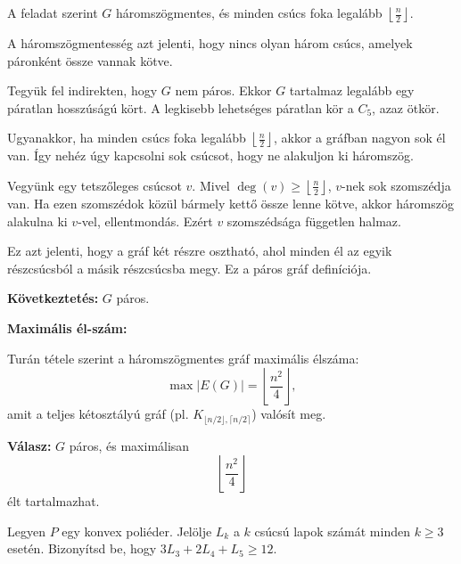 \begin{solution}
	A feladat szerint $G$ háromszögmentes, és minden csúcs foka legalább
	$\left\lfloor \frac{n}{2}\right\rfloor $.
	
	A háromszögmentesség azt jelenti, hogy nincs olyan három csúcs, amelyek
	páronként össze vannak kötve.
	
	Tegyük fel indirekten, hogy $G$ nem páros. Ekkor $G$ tartalmaz
	legalább egy páratlan hosszúságú kört. A legkisebb lehetséges páratlan
	kör a $C_{5}$, azaz ötkör.
	
	Ugyanakkor, ha minden csúcs foka legalább $\left\lfloor \frac{n}{2}\right\rfloor $,
	akkor a gráfban nagyon sok él van. Így nehéz úgy kapcsolni sok csúcsot,
	hogy ne alakuljon ki háromszög.
	
	Vegyünk egy tetszőleges csúcsot $v$. Mivel $\deg(v)\geq\left\lfloor \frac{n}{2}\right\rfloor $,
	$v$-nek sok szomszédja van. Ha ezen szomszédok közül bármely kettő
	össze lenne kötve, akkor háromszög alakulna ki $v$-vel, ellentmondás.
	Ezért $v$ szomszédsága független halmaz.
	
	Ez azt jelenti, hogy a gráf két részre osztható, ahol minden él az
	egyik részcsúcsból a másik részcsúcsba megy. Ez a páros gráf definíciója.
	
	\bigskip{}
	
	\textbf{Következtetés:} $G$ páros.
	
	\bigskip{}
	
	\textbf{Maximális él-szám:}
	
	Turán tétele szerint a háromszögmentes gráf maximális élszáma: 
	\[
	\max|E(G)|=\left\lfloor \frac{n^{2}}{4}\right\rfloor ,
	\]
	amit a teljes kétosztályú gráf (pl. $K_{\lfloor n/2\rfloor,\lceil n/2\rceil}$)
	valósít meg.
	
	\bigskip{}
	
	\textbf{Válasz:} $G$ páros, és maximálisan 
	\[
	\left\lfloor \frac{n^{2}}{4}\right\rfloor 
	\]
	élt tartalmazhat. 
\end{solution}
\begin{extraproblem}
	Legyen $P$ egy konvex poliéder. Jelölje $L_{k}$ a $k$ csúcsú lapok
	számát minden $k\geq3$ esetén. Bizonyítsd be, hogy $3L_{3}+2L_{4}+L_{5}\geq12.$ 
\end{extraproblem}

